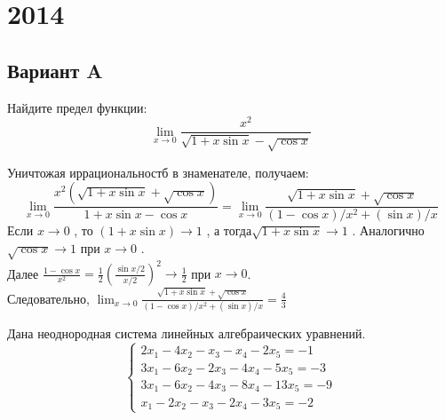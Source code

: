 \documentclass[addpoints, answers]{exam} %
\begin{document}
\section{2014}
\subsection{Вариант A}
\begin{questions}

\question Найдите предел функции: 
\[\lim_{x\to0}\frac{x^2}{\sqrt{1+x\sin x}-\sqrt{\cos x}}\]

\begin{solution}
Уничтожая иррациональностб в знаменателе, получаем:\\
\[
\lim_{x\to0}\frac{x^2(\sqrt{1+x\sin x}+\sqrt{\cos x})}{1+x\sin x-\cos x}=\lim_{x\to0}\frac{\sqrt{1+x\sin x}+\sqrt{\cos x}}{(1-\cos x)/x^2+(\sin x)/x}
\]
Если $x \to 0 $ , то $(1+x\sin x) \to 1$  , а тогда$\sqrt{1+x \sin x}\to 1$  . Аналогично $\sqrt{\cos x}\to 1$ при $x \to 0$ . \\
Далее $\frac{1-\cos x}{x^2}=\frac12 (\frac{\sin x/2}{x/2})^2\to \frac12$  при  $x \to 0$.\\ Следовательно, $\lim_{x\to0}\frac{\sqrt{1+x\sin x}+\sqrt{\cos x}}{(1-\cos x)/x^2+(\sin x)/x} = \frac43$
\end{solution}

\question Дана неоднородная система линейных алгебраических уравнений.\[\begin{cases}
2x_1-4x_2-x_3-x_4-2x_5=-1\\
3x_1-6x_2-2x_3-4x_4-5x_5=-3\\
3x_1-6x_2-4x_3-8x_4-13x_5=-9\\
x_1-2x_2-x_3-2x_4-3x_5=-2
\end{cases}\]
\end{questions}
\end{document}
